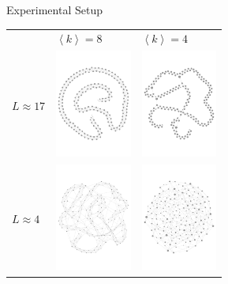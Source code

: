 \documentclass[12pt, notes=show]{beamer}
\begin{document}
	\begin{frame}{Experimental Setup}
		\begin{table}
			\centering
			\begin{tabular}{m{1.2cm}m{2.5cm}m{2.5cm}}
				&$\left\langle k\right\rangle=8$ & $\left\langle k\right\rangle=4$\\
				$L\approx17$&
				\includegraphics[width=2.5cm]{images/g02.pdf}&
				\includegraphics[width=2.5cm]{images/g00.pdf}\\
				$L\approx4$&
				\includegraphics[width=2.5cm]{images/g42.pdf}&
				\includegraphics[width=2.5cm]{images/g40.pdf}\\
			\end{tabular}
		\end{table}
	\end{frame}
\end{document}
